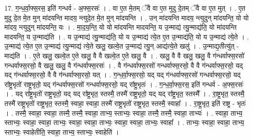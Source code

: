 \documentclass[17pt]{extarticle}
\begin{document}
17. ग॒न्ध॒र्वा॒फ्स॒रस॒ इति॑ गन्धर्व - अ॒फ्स॒रसः॑ । . वा ए॒त मे॒तम् ॅवै वा ए॒त मुदु दे॒तम् ॅवै वा ए॒त मुत् । . ए॒त मुदु दे॒त मे॒त मुन् मा॑दयन्ति मादय॒ न्त्युदे॒त मे॒त मुन् मा॑दयन्ति । . उन् मा॑दयन्ति मादय॒ न्त्युदुन् मा॑दयन्ति॒ यो यो मा॑दय॒ न्त्युदुन् मा॑दयन्ति॒ यः । . मा॒द॒य॒न्ति॒ यो यो मा॑दयन्ति मादयन्ति॒ य उ॒न्माद्य॑ त्यु॒न्माद्य॑ति॒ यो मा॑दयन्ति मादयन्ति॒ य उ॒न्माद्य॑ति । . य उ॒न्माद्य॑ त्यु॒न्माद्य॑ति॒ यो य उ॒न्माद्य॑ त्ये॒त ए॒त उ॒न्माद्य॑ति॒ यो य उ॒न्माद्य॑ त्ये॒ते । . उ॒न्माद्य॑ त्ये॒त ए॒त उ॒न्माद्य॑ त्यु॒न्माद्य॑ त्ये॒ते खलु॒ खल्वे॒त उ॒न्माद्य॑ त्यु॒न् आद्य॑त्ये॒ते खलु॑ । . उ॒न्माद्य॒तीत्यु॑त् - माद्य॑ति । . ए॒ते खलु॒ खल्वे॒त ए॒ते खलु॒ वै वै खल्वे॒त ए॒ते खलु॒ वै । . खलु॒ वै वै खलु॒ खलु॒ वै ग॑न्धर्वाफ्स॒रसो॑ गन्धर्वाफ्स॒रसो॒ वै खलु॒ खलु॒ वै ग॑न्धर्वाफ्स॒रसः॑ । . वै ग॑न्धर्वाफ्स॒रसो॑ गन्धर्वाफ्स॒रसो॒ वै वै ग॑न्धर्वाफ्स॒रसो॒ यद् यद् ग॑न्धर्वाफ्स॒रसो॒ वै वै ग॑न्धर्वाफ्स॒रसो॒ यत् । . ग॒न्ध॒र्वा॒फ्स॒रसो॒ यद् यद् ग॑न्धर्वाफ्स॒रसो॑ गन्धर्वाफ्स॒रसो॒ यद् रा᳚ष्ट्र॒भृतो॑ राष्ट्र॒भृतो॒ यद् ग॑न्धर्वाफ्स॒रसो॑ गन्धर्वाफ्स॒रसो॒ यद् रा᳚ष्ट्र॒भृतः॑ । . ग॒न्ध॒र्वा॒फ्स॒रस॒ इति॑ गन्धर्व - अ॒फ्स॒रसः॑ । . यद् रा᳚ष्ट्र॒भृतो॑ राष्ट्र॒भृतो॒ यद् यद् रा᳚ष्ट्र॒भृत॒ स्तस्मै॒ तस्मै॑ राष्ट्र॒भृतो॒ यद् यद् 
रा᳚ष्ट्र॒भृत॒ स्तस्मै᳚ । . रा॒ष्ट्र॒भृत॒ स्तस्मै॒ तस्मै॑ राष्ट्र॒भृतो॑ राष्ट्र॒भृत॒ स्तस्मै॒ स्वाहा॒ स्वाहा॒ तस्मै॑ राष्ट्र॒भृतो॑ राष्ट्र॒भृत॒ स्तस्मै॒ स्वाहा᳚ । . रा॒ष्ट्र॒भृत॒ इति॑ राष्ट्र - भृतः॑ । . तस्मै॒ स्वाहा॒ स्वाहा॒ तस्मै॒ तस्मै॒ स्वाहा॒ ताभ्य॒ स्ताभ्यः॒ स्वाहा॒ तस्मै॒ तस्मै॒ स्वाहा॒ ताभ्यः॑ । . स्वाहा॒ ताभ्य॒ स्ताभ्यः॒ स्वाहा॒ स्वाहा॒ ताभ्यः॒ स्वाहा॒ स्वाहा॒ ताभ्यः॒ स्वाहा॒ स्वाहा॒ ताभ्यः॒ स्वाहा᳚ । . ताभ्यः॒ स्वाहा॒ स्वाहा॒ ताभ्य॒ स्ताभ्यः॒ स्वाहेतीति॒ स्वाहा॒ ताभ्य॒ स्ताभ्यः॒ स्वाहेति॑ । \newline
\end{document}
